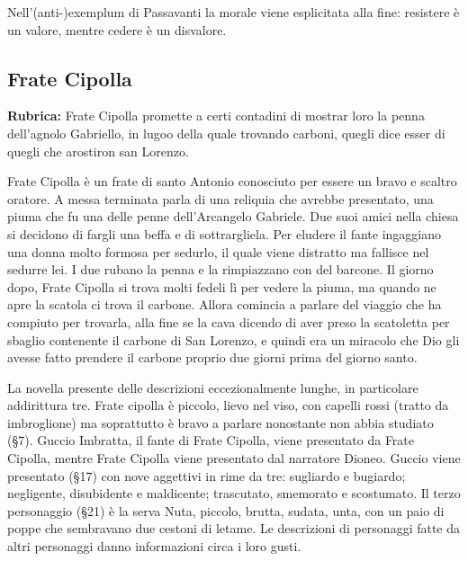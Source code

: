 \documentclass[a4paper]{article}
\begin{document}
Nell'(anti-)exemplum di Passavanti la morale viene esplicitata alla fine: resistere è un valore,
mentre cedere è un disvalore.


\pagebreak

\subsection{Frate Cipolla}


\textbf{Rubrica:} Frate Cipolla promette a certi contadini di mostrar loro la penna dell'agnolo Gabriello, in lugoo della quale trovando carboni, quegli dice esser di quegli che arostiron san Lorenzo.

Frate Cipolla è un frate di santo Antonio conosciuto per essere un bravo e scaltro oratore.
A messa terminata parla di una reliquia che avrebbe presentato, una piuma che fu una delle penne dell'Arcangelo Gabriele.
Due suoi amici nella chiesa si decidono di fargli una beffa e di sottrargliela.
Per eludere il fante ingaggiano una donna molto formosa per sedurlo, il quale viene distratto ma fallisce nel sedurre lei.
I due rubano la penna e la rimpiazzano con del barcone.
Il giorno dopo, Frate Cipolla si trova molti fedeli lì per vedere la piuma, ma quando ne apre la scatola
ci trova il carbone. Allora comincia a parlare del viaggio che ha compiuto per trovarla,
alla fine se la cava dicendo di aver preso la scatoletta per sbaglio contenente il carbone di San Lorenzo,
e quindi era un miracolo che Dio gli avesse fatto prendere il carbone proprio due giorni prima del giorno santo.


La novella presente delle descrizioni eccezionalmente lunghe, in particolare addirittura tre.
Frate cipolla è piccolo, lievo nel viso, con capelli rossi (tratto da imbroglione) ma
soprattutto è bravo a parlare nonostante non abbia studiato (§7).
Guccio Imbratta, il fante di Frate Cipolla, viene presentato da Frate Cipolla,
mentre Frate Cipolla viene presentato dal narratore Dioneo.
Guccio viene presentato (§17) con nove aggettivi in rime da tre:
sugliardo e bugiardo; negligente, disubidente e maldicente; trascutato, smemorato e scostumato.
Il terzo personaggio (§21) è la serva Nuta, piccolo, brutta, sudata, unta, con un paio di poppe che sembravano due
cestoni di letame.
Le descrizioni di personaggi fatte da altri personaggi danno informazioni circa i loro gusti.
\end{document}
